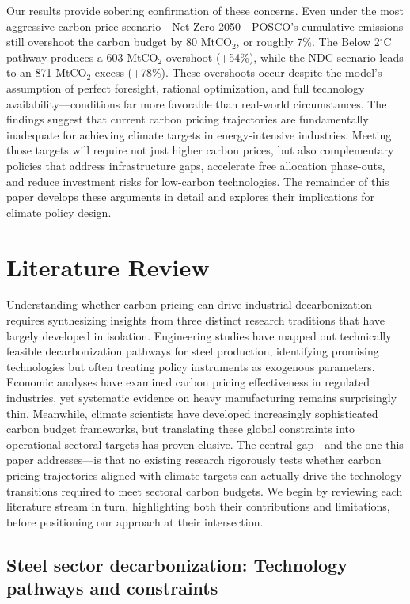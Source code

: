 \documentclass[preprint,1p,authoryear]{elsarticle}
\begin{document}
Our results provide sobering confirmation of these concerns. Even under the most aggressive carbon price scenario—Net Zero 2050—POSCO's cumulative emissions still overshoot the carbon budget by 80 MtCO$_2$, or roughly 7\%. The Below 2$^\circ$C pathway produces a 603 MtCO$_2$ overshoot (+54\%), while the NDC scenario leads to an 871 MtCO$_2$ excess (+78\%). These overshoots occur despite the model's assumption of perfect foresight, rational optimization, and full technology availability—conditions far more favorable than real-world circumstances. The findings suggest that current carbon pricing trajectories are fundamentally inadequate for achieving climate targets in energy-intensive industries. Meeting those targets will require not just higher carbon prices, but also complementary policies that address infrastructure gaps, accelerate free allocation phase-outs, and reduce investment risks for low-carbon technologies. The remainder of this paper develops these arguments in detail and explores their implications for climate policy design.

\section{Literature Review}

Understanding whether carbon pricing can drive industrial decarbonization requires synthesizing insights from three distinct research traditions that have largely developed in isolation. Engineering studies have mapped out technically feasible decarbonization pathways for steel production, identifying promising technologies but often treating policy instruments as exogenous parameters. Economic analyses have examined carbon pricing effectiveness in regulated industries, yet systematic evidence on heavy manufacturing remains surprisingly thin. Meanwhile, climate scientists have developed increasingly sophisticated carbon budget frameworks, but translating these global constraints into operational sectoral targets has proven elusive. The central gap—and the one this paper addresses—is that no existing research rigorously tests whether carbon pricing trajectories aligned with climate targets can actually drive the technology transitions required to meet sectoral carbon budgets. We begin by reviewing each literature stream in turn, highlighting both their contributions and limitations, before positioning our approach at their intersection.

\subsection{Steel sector decarbonization: Technology pathways and constraints}
\end{document}
